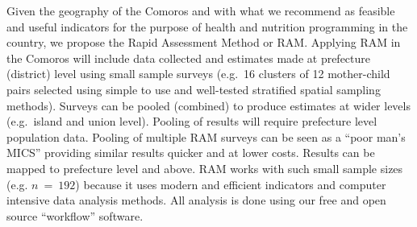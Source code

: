 \documentclass[12pt,a4paper]{article}
\begin{document}
Given the geography of the Comoros and with what we recommend as feasible and useful indicators for the purpose of health and nutrition programming in the country, we propose the Rapid Assessment Method or RAM. Applying RAM in the Comoros will include data collected and estimates made at prefecture (district) level using small sample surveys (e.g.~16 clusters of 12 mother-child pairs selected using simple to use and well-tested stratified spatial sampling methods). Surveys can be pooled (combined) to produce estimates at wider levels (e.g.~island and union level). Pooling of results will require prefecture level population data. Pooling of multiple RAM surveys can be seen as a ``poor man's MICS'' providing similar results quicker and at lower costs. Results can be mapped to prefecture level and above. RAM works with such small sample sizes (e.g. \(n ~ = ~ 192\)) because it uses modern and efficient indicators and computer intensive data analysis methods. All analysis is done using our free and open source ``workflow'' software.
\end{document}
